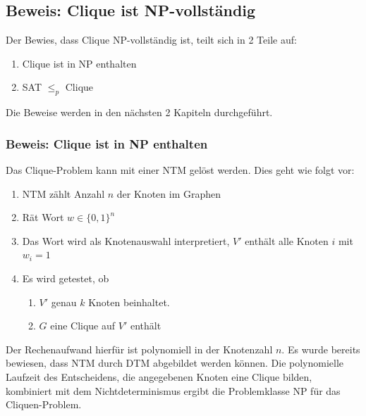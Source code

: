 \documentclass[ngerman]{article}
\begin{document}
\subsection{Beweis: Clique ist NP-vollständig}
Der Bewies, dass Clique NP-vollständig ist, teilt sich in 2 Teile auf:
\begin{enumerate}
\item Clique ist in NP enthalten
\item SAT $\le_p$ Clique
\end{enumerate}
Die Beweise werden in den nächsten 2 Kapiteln durchgeführt.

\subsubsection{Beweis: Clique ist in NP enthalten}
Das Clique-Problem kann mit einer NTM gelöst werden. Dies geht wie folgt vor:
\begin{enumerate}
\item NTM zählt Anzahl $n$ der Knoten im Graphen
\item Rät Wort $w \in \{0,1\}^n$
\item Das Wort wird als Knotenauswahl interpretiert, $V'$ enthält alle Knoten $i$ mit $w_i = 1$
\item Es wird getestet, ob
\begin{enumerate}
\item \(V'\) genau \(k\) Knoten beinhaltet.
\item \(G\) eine Clique auf \(V'\) enthält
\end{enumerate}
\end{enumerate}
Der Rechenaufwand hierfür ist polynomiell in der Knotenzahl $n$.
Es wurde bereits bewiesen, dass NTM durch DTM abgebildet werden können.
Die polynomielle Laufzeit des Entscheidens, die angegebenen Knoten eine Clique bilden, kombiniert mit dem Nichtdeterminismus ergibt die Problemklasse NP für das Cliquen-Problem.
\end{document}
